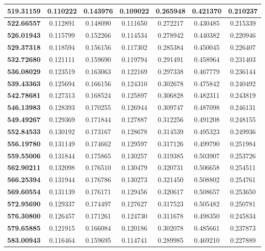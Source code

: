 \documentclass[10pt, a4paper]{article}
\begin{document}
\begin{appendices}
\begin{longtable}{|c|c|c|c|c|c|c|}
	\textbf{519.31159} & 0.110222 & 0.143976 & 0.109022 & 0.265948 & 0.421370 & 0.210237 \\ \hline
	\textbf{522.66557} & 0.112891 & 0.148090 & 0.111650 & 0.272217 & 0.430485 & 0.215339 \\ \hline
	\textbf{526.01943} & 0.115799 & 0.152266 & 0.114534 & 0.278942 & 0.440382 & 0.220946 \\ \hline
	\textbf{529.37318} & 0.118594 & 0.156156 & 0.117302 & 0.285384 & 0.450045 & 0.226407 \\ \hline
	\textbf{532.72680} & 0.121111 & 0.159690 & 0.119794 & 0.291491 & 0.458964 & 0.231403 \\ \hline
	\textbf{536.08029} & 0.123519 & 0.163063 & 0.122169 & 0.297338 & 0.467779 & 0.236144 \\ \hline
	\textbf{539.43363} & 0.125694 & 0.166156 & 0.124310 & 0.302678 & 0.475842 & 0.240492 \\ \hline
	\textbf{542.78681} & 0.127313 & 0.168524 & 0.125897 & 0.306828 & 0.482311 & 0.243819 \\ \hline
	\textbf{546.13983} & 0.128393 & 0.170255 & 0.126944 & 0.309747 & 0.487098 & 0.246131 \\ \hline
	\textbf{549.49267} & 0.129369 & 0.171844 & 0.127887 & 0.312256 & 0.491208 & 0.248155 \\ \hline
	\textbf{552.84533} & 0.130192 & 0.173167 & 0.128678 & 0.314539 & 0.495323 & 0.249936 \\ \hline
	\textbf{556.19780} & 0.131149 & 0.174662 & 0.129597 & 0.317126 & 0.499790 & 0.251984 \\ \hline
	\textbf{559.55006} & 0.131844 & 0.175865 & 0.130257 & 0.319385 & 0.503907 & 0.253726 \\ \hline
	\textbf{562.90211} & 0.132098 & 0.176510 & 0.130479 & 0.320731 & 0.506658 & 0.254511 \\ \hline
	\textbf{566.25394} & 0.131944 & 0.176786 & 0.130273 & 0.321450 & 0.508802 & 0.254761 \\ \hline
	\textbf{569.60554} & 0.131139 & 0.176171 & 0.129456 & 0.320617 & 0.508657 & 0.253650 \\ \hline
	\textbf{572.95690} & 0.129337 & 0.174497 & 0.127627 & 0.317523 & 0.505482 & 0.250781 \\ \hline
	\textbf{576.30800} & 0.126457 & 0.171261 & 0.124730 & 0.311678 & 0.498350 & 0.245834 \\ \hline
	\textbf{579.65885} & 0.121915 & 0.166084 & 0.120186 & 0.302078 & 0.485661 & 0.237873 \\ \hline
	\textbf{583.00943} & 0.116464 & 0.159695 & 0.114741 & 0.289985 & 0.469210 & 0.227889 \\ \hline

\end{longtable}
\end{appendices}
\end{document}
